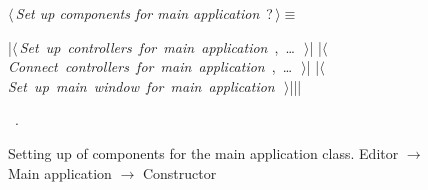 \documentclass[%
    a4paper,    %
    justified,  %
    nobib,      %
    openany     %
]{tufte-book}
\begin{document}
\begin{figure}
\begin{flushleft} \small
\begin{minipage}{\linewidth}\label{scrap18}\raggedright\small
{} $\langle\,${\itshape Set up components for main application}\nobreak\ {\footnotesize {?}}$\,\rangle\equiv$
\vspace{-1ex}
\begin{pythoncode}
|\hbox{$\langle\,${\itshape Set up controllers for main application}\nobreak\ {\footnotesize {}, \ldots\ }$\,\rangle$}|
|\hbox{$\langle\,${\itshape Connect controllers for main application}\nobreak\ {\footnotesize {}, \ldots\ }$\,\rangle$}|
|\hbox{$\langle\,${\itshape Set up main window for main application}\nobreak\ {\footnotesize {}}$\,\rangle$}||\NWsep|
\end{pythoncode}
\vspace{1.5ex}
\footnotesize
\begin{list}{}{\setlength{\itemsep}{-\parsep}\setlength{\itemindent}{-\leftmargin}}
\item \NWtxtMacroRefIn\ .

\item{}
\end{list}
\end{minipage}\vspace{4ex}
\end{flushleft}
\caption{Setting up of components for the main application class.
  \newline{}\newline{}Editor $\rightarrow$ Main application $\rightarrow$
  Constructor}
\label{editor:lst:main-application:constructor:methods}
\end{figure}
\end{document}

